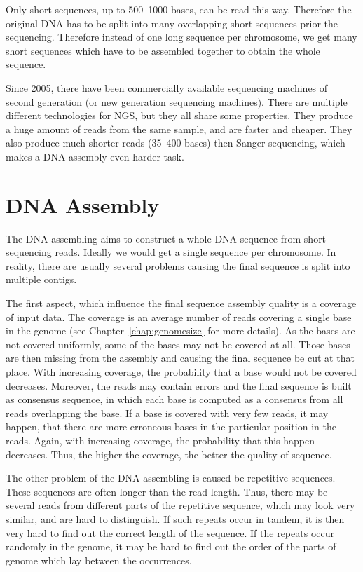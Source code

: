 Only short sequences, up to 500--1000 bases, can be read this way. Therefore the original DNA has to be split into many overlapping short sequences prior the sequencing.
Therefore instead of one long sequence per chromosome, we get many short sequences which have to be assembled together to obtain the whole sequence.

Since 2005, there have been commercially available sequencing machines of second generation (or new generation sequencing machines). There are multiple different technologies for NGS, but they all share some properties.
They produce a huge amount of reads from the same sample, and are faster and cheaper. They also produce much shorter reads (35--400 bases) then Sanger sequencing, which makes a DNA assembly even harder task.

\section{DNA Assembly}

The DNA assembling aims to construct a whole DNA sequence from short sequencing reads. Ideally we would get a single sequence per chromosome. In reality, there are usually several problems causing the final sequence is split into multiple contigs.

The first aspect, which influence the final sequence assembly quality is a coverage of input data. The coverage is an average number of reads covering a single base in the genome (see Chapter~\ref{chap:genomesize} for more details).
As the bases are not covered uniformly, some of the bases may not be covered at all. Those bases are then missing from the assembly and causing the final sequence be cut at that place. With increasing coverage, the probability that a base would not be covered decreases.
Moreover, the reads may contain errors and the final sequence is built as consensus sequence, in which each base is computed as a consensus from all reads overlapping the base. If a base is covered with very few reads, it may happen, that there are more erroneous bases in the particular position in the reads. Again, with increasing coverage, the probability that this happen decreases. Thus, the higher the coverage, the better the quality of sequence.

The other problem of the DNA assembling is caused be repetitive sequences. These sequences are often longer than the read length. Thus, there may be several reads from different parts of the repetitive sequence, which may look very similar, and are hard to distinguish. If such repeats occur in tandem, it is then very hard to find out the correct length of the sequence. If the repeats occur randomly in the genome, it may be hard to find out the order of the parts of genome which lay between the occurrences.

